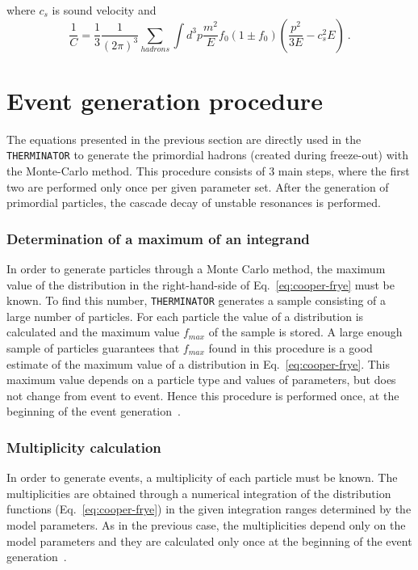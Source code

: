       where $c_s$ is sound velocity and
      \begin{equation}
        \frac{1}{C} = \frac{1}{3} \frac{1}{(2\pi)^3}\sum\limits_{hadrons} \int d^3 p \frac{m^2}{E} f_0 (1 \pm f_0) \left( \frac{p^2}{3E} - c_s^2 E \right)~.
      \end{equation}
  \section{Event generation procedure}
  \label{sec:events-generation}
    The equations presented in the previous section are directly used in the \verb|THERMINATOR| to generate the primordial hadrons (created during freeze-out) with the Monte-Carlo method.
    This procedure consists of 3 main steps, where the first two are performed only once per given parameter set.
    After the generation of primordial particles, the cascade decay of unstable resonances is performed.
    \subsubsection{Determination of a maximum of an integrand}
      In order to generate particles through a Monte Carlo method, the maximum value of the distribution in the right-hand-side of Eq.~\ref{eq:cooper-frye} must be known.
      To find this number, \verb|THERMINATOR| generates a sample consisting of a large number of particles.
      For each particle the value of a distribution is calculated and the maximum value $f_{max}$ of the sample is stored.
      A large enough sample of particles guarantees that $f_{max}$ found in this procedure is a good estimate of the maximum value of a distribution in Eq.~\ref{eq:cooper-frye}.
      This maximum value depends on a particle type and values of parameters, but does not change from event to event.
      Hence this procedure is performed once, at the beginning of the event generation~\cite{therminator}.
    \subsubsection{Multiplicity calculation}
      In order to generate events, a multiplicity of each particle must be known.
      The multiplicities are obtained through a numerical integration of the distribution functions (Eq.~\ref{eq:cooper-frye}) in the given integration ranges determined by the model parameters.
      As in the previous case, the multiplicities depend only on the model parameters and they are calculated only once at the beginning of the event generation~\cite{therminator}.
